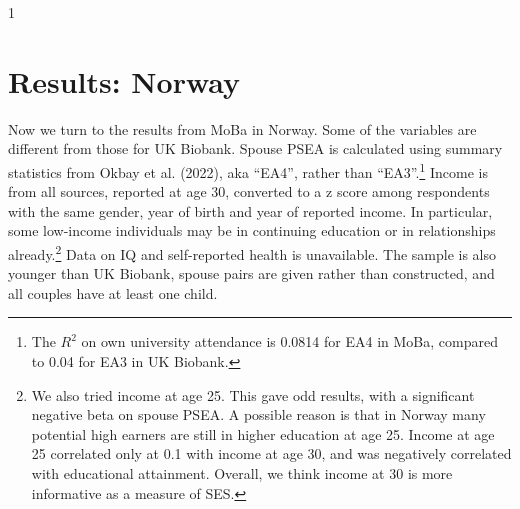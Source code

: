 \documentclass[
  12pt,
]{article}
\theoremstyle{definition}
\theoremstyle{definition}
\theoremstyle{definition}
\theoremstyle{definition}
\theoremstyle{remark}
\begin{document}
\begin{table}[ht]
\begin{centerbox}
\begin{threeparttable}
\begin{tabularx}{1\textwidth}
 \tabularnewline[-0.5pt]


\hhline{}
\end{tabularx}
\end{threeparttable}\par\end{centerbox}

\end{table}
 

\FloatBarrier

\hypertarget{results-norway}{%
\section{Results: Norway}\label{results-norway}}

Now we turn to the results from MoBa in Norway. Some of the variables are
different from those for UK Biobank. Spouse PSEA is calculated using summary
statistics from Okbay et al. (2022), aka ``EA4'', rather than ``EA3''.\footnote{The \(R^2\) on own university attendance is
  0.0814 for EA4 in MoBa, compared to
  0.04 for EA3 in UK Biobank.}
Income is from all sources, reported at age 30, converted to a z score among
respondents with the same gender, year of birth and year of reported income.
In particular, some low-income individuals may be in continuing education or in
relationships already.\footnote{We also tried income at age 25. This gave odd results, with a
  significant negative beta on spouse PSEA. A possible reason is that in Norway many
  potential high earners are still in higher education at age 25. Income at age 25
  correlated only at 0.1 with income at age 30, and was negatively correlated with
  educational attainment. Overall, we think income at 30 is more informative as a
  measure of SES.} Data on IQ and self-reported health is
unavailable. The sample is also younger than UK Biobank, spouse pairs are given
rather than constructed, and all couples have at least one child.
\end{document}
